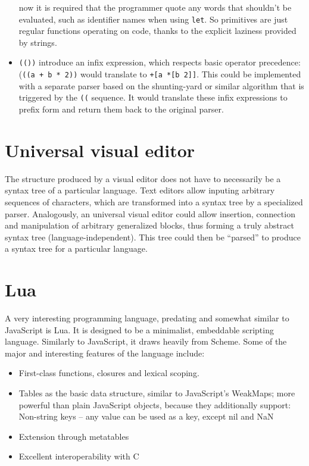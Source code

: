 \begin{itemize}
    now it is required that the programmer quote any words that shouldn't be
    evaluated, such as identifier names when using \texttt{let}. So primitives
    are just regular functions operating on code, thanks to the explicit
    laziness provided by strings.
    \item \texttt{(())} introduce an infix expression, which respects basic
    operator precedence: (\texttt{((a + b * 2))} would translate to
    \texttt{+[a *[b 2]]}. This could be implemented with a separate parser
    based on the
    shunting-yard\cite{shunting_yard} or
    similar algorithm that is triggered by the \texttt{((} sequence. It would
    translate these infix expressions to prefix form and return them back to
    the original parser.
\end{itemize}

\section{Universal visual editor}
The structure produced by a visual editor does not have to necessarily be a
syntax tree of a particular language.  Text editors allow inputing arbitrary
sequences of characters, which are transformed into a syntax tree by a
specialized parser. Analogously, an universal visual editor could allow
insertion, connection and manipulation of arbitrary generalized blocks, thus
forming a truly abstract syntax tree (language-independent). This tree could
then be ``parsed'' to produce a syntax tree for a particular language.

\section{Lua}
A very interesting programming language, predating and somewhat similar to JavaScript is Lua. It is designed to be a minimalist, embeddable scripting language. Similarly to JavaScript, it draws heavily from Scheme. Some of the major and interesting features of the language include:
\begin{itemize}
    \item First-class functions, closures and lexical scoping.
    \item Tables as the basic data structure, similar to JavaScript's WeakMaps; more powerful than plain JavaScript objects, because they additionally support:
    Non-string keys -- any value can be used as a key, except nil and NaN
    \item Extension through metatables
    \item Excellent interoperability with C
\end{itemize} 


